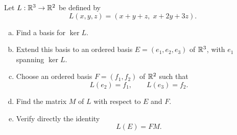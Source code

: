 \begin{exercise}
  \label{ex:hw04:adapted-bases}
  Let \(L:\mathbb{R}^3\to\mathbb{R}^2\) be defined by
  \[
    L(x,y,z)=(x+y+z,\;x+2y+3z).
  \]
  \begin{enumerate}[(a)][2]
    \item Find a basis for \(\ker L\).
    \item Extend this basis to an ordered basis \(E=(e_1,e_2,e_3)\)
      of \(\mathbb{R}^3\), with \(e_1\) spanning \(\ker L\).
    \item Choose an ordered basis \(F=(f_1,f_2)\) of \(\mathbb{R}^2\)
      such that
      \[
        L(e_2)=f_1,\qquad L(e_3)=f_2.
      \]
    \item Find the matrix \(M\) of \(L\) with respect to \(E\) and \(F\).
    \item Verify directly the identity
      \[
        L(E)=FM.
      \]
  \end{enumerate}
\end{exercise}
